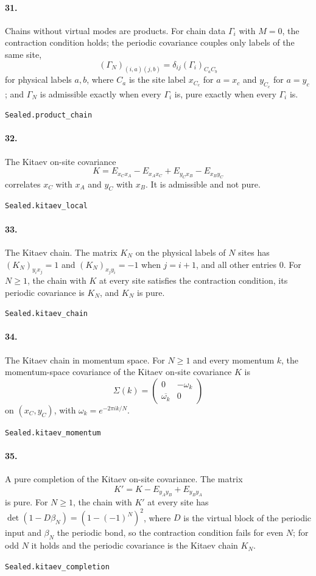 \documentclass[11pt]{article}
\begin{document}
\paragraph{31.} Chains without virtual modes are products. For chain data $\Gamma_i$ with $M = 0$, the contraction condition holds; the periodic covariance couples only labels of the same site, \[(\Gamma_N)_{(i,a)(j,b)} = \delta_{ij} (\Gamma_i)_{C_a C_b}\] for physical labels $a, b$, where $C_a$ is the site label $x_{C_c}$ for $a = x_c$ and $y_{C_c}$ for $a = y_c$; and $\Gamma_N$ is admissible exactly when every $\Gamma_i$ is, pure exactly when every $\Gamma_i$ is.\par{\footnotesize\texttt{Sealed.product\_chain}}

\paragraph{32.} The Kitaev on-site covariance \[K = E_{x_C x_A} - E_{x_A x_C} + E_{y_C x_B} - E_{x_B y_C}\] correlates $x_C$ with $x_A$ and $y_C$ with $x_B$. It is admissible and not pure.\par{\footnotesize\texttt{Sealed.kitaev\_local}}

\paragraph{33.} The Kitaev chain. The matrix $K_N$ on the physical labels of $N$ sites has $(K_N)_{y_i x_j} = 1$ and $(K_N)_{x_j y_i} = -1$ when $j = i + 1$, and all other entries $0$. For $N \ge 1$, the chain with $K$ at every site satisfies the contraction condition, its periodic covariance is $K_N$, and $K_N$ is pure.\par{\footnotesize\texttt{Sealed.kitaev\_chain}}

\paragraph{34.} The Kitaev chain in momentum space. For $N \ge 1$ and every momentum $k$, the momentum-space covariance of the Kitaev on-site covariance $K$ is \[\Sigma(k) = \begin{pmatrix} 0 & -\omega_k \\ \overline{\omega_k} & 0 \end{pmatrix}\] on $(x_C, y_C)$, with $\omega_k = e^{-2\pi i k / N}$.\par{\footnotesize\texttt{Sealed.kitaev\_momentum}}

\paragraph{35.} A pure completion of the Kitaev on-site covariance. The matrix \[K' = K - E_{y_A y_B} + E_{y_B y_A}\] is pure. For $N \ge 1$, the chain with $K'$ at every site has $\det(1 - D \beta_N) = (1 - (-1)^N)^2$, where $D$ is the virtual block of the periodic input and $\beta_N$ the periodic bond, so the contraction condition fails for even $N$; for odd $N$ it holds and the periodic covariance is the Kitaev chain $K_N$.\par{\footnotesize\texttt{Sealed.kitaev\_completion}}
\end{document}
